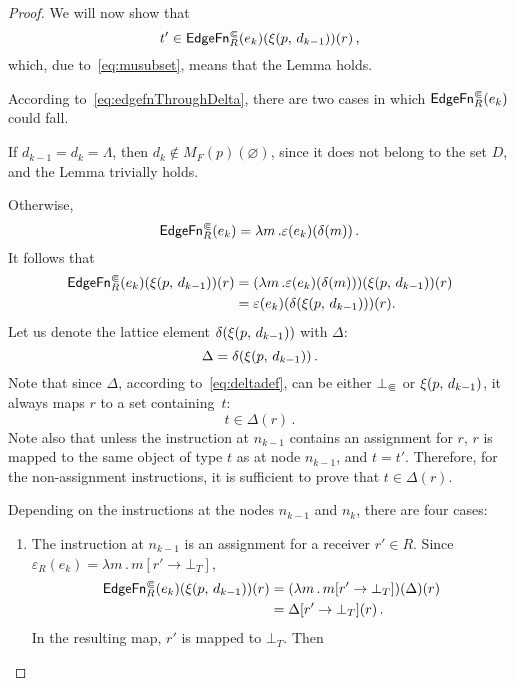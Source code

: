 \begin{proof}
  We will now show that
  \[
    t'\in\textsf{EdgeFn}^\Subset_{R}(e_k)(\xi(p,\,d_{k-1}))(r)\,,
  \]
  which, due to~\eqref{eq:musubset}, means that the Lemma holds.
  
  According to~\eqref{eq:edgefnThroughDelta}, there are two cases in which $\textsf{EdgeFn}^\Subset_{R}(e_k)$ could fall.

  If $d_{k-1}=d_k=\Lambda$, then $d_k\notin M_F(p)(\varnothing)$, since it does not belong to the set $D$, and the Lemma trivially holds.
  
  Otherwise, 
  \[
    \textsf{EdgeFn}^\Subset_{R}(e_k)=\lambda m\,.\varepsilon(e_k)(\delta(m))\,.
  \]
  It follows that
  \begin{align}\label{eq:efek}
    \textsf{EdgeFn}^\Subset_{R}(e_k)(\xi(p,\,d_{k-1}))(r)
    &=(\lambda m\,.\varepsilon(e_k)(\delta(m)))(\xi(p,\,d_{k-1}))(r)\notag\\
    &=\varepsilon(e_k)(\delta(\xi(p,\,d_{k-1})))(r).
  \end{align}
  Let us denote the lattice element $\delta(\xi(p,\,d_{k-1}))$ with $\Delta$:
  \[
    \Delta=\delta(\xi(p,\,d_{k-1}))\,.
  \]
  Note that since $\Delta$, according to~\eqref{eq:deltadef}, can be either $\bot_\Subset$ or $\xi(p,\,d_{k-1})$, it always maps $r$ to a set containing~$t$:
  \begin{equation}\label{eq:deltaContainsT}
    t\in\Delta(r)\,.
  \end{equation}
  Note also that unless the instruction at $n_{k-1}$ contains an assignment for $r$, $r$ is mapped to the same object of type $t$ as at node $n_{k-1}$, and $t=t'$. Therefore, for the non-assignment instructions, it is sufficient to prove that $t\in\Delta(r)$.
 
   Depending on the instructions at the nodes $n_{k-1}$ and $n_k$, there are four cases:
  \begin{enumerate}
    \item\label{item:asgn} The instruction at $n_{k-1}$ is an assignment for a receiver $r'\in R$.
        Since $\varepsilon_R(e_k)=\lambda m\,.\,m[r'\to\bot_T]$,
        \begin{align*}
          \textsf{EdgeFn}^\Subset_{R}(e_k)(\xi(p,\,d_{k-1}))(r)&=            
            (\lambda m\,.\,m[r'\to\bot_T])(\Delta)(r)\\
          &=\Delta[r'\to\bot_T](r)\,.
        \end{align*}
      In the resulting map, $r'$ is mapped to $\bot_T$. Then
      

\end{enumerate}
\end{proof}
